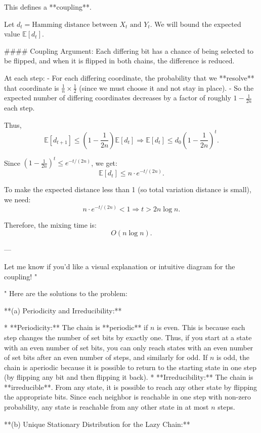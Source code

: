 \begin{enumerate}
\begin{shaded}
This defines a **coupling**.

Let \( d_t = \text{Hamming distance between } X_t \text{ and } Y_t \). We will bound the expected value \( \mathbb{E}[d_t] \).

#### Coupling Argument:
Each differing bit has a chance of being selected to be flipped, and when it is flipped in both chains, the difference is reduced.

At each step:
- For each differing coordinate, the probability that we **resolve** that coordinate is \( \frac{1}{n} \times \frac{1}{2} \) (since we must choose it and not stay in place).
- So the expected number of differing coordinates decreases by a factor of roughly \( 1 - \frac{1}{2n} \) each step.

Thus,
\[
\mathbb{E}[d_{t+1}] \leq \left(1 - \frac{1}{2n}\right) \mathbb{E}[d_t]
\Rightarrow \mathbb{E}[d_t] \leq d_0 \left(1 - \frac{1}{2n}\right)^t.
\]

Since \( \left(1 - \frac{1}{2n}\right)^t \leq e^{-t/(2n)} \), we get:
\[
\mathbb{E}[d_t] \leq n \cdot e^{-t/(2n)}.
\]

To make the expected distance less than 1 (so total variation distance is small), we need:
\[
n \cdot e^{-t/(2n)} < 1 \Rightarrow t > 2n \log n.
\]

Therefore, the mixing time is:
\[
\boxed{O(n \log n)}.
\]

---

Let me know if you'd like a visual explanation or intuitive diagram for the coupling!
"

"
Here are the solutions to the problem:

**(a) Periodicity and Irreducibility:**

* **Periodicity:** The chain is **periodic** if $n$ is even. This is because each step changes the number of set bits by exactly one. Thus, if you start at a state with an even number of set bits, you can only reach states with an even number of set bits after an even number of steps, and similarly for odd. If $n$ is odd, the chain is aperiodic because it is possible to return to the starting state in one step (by flipping any bit and then flipping it back).
* **Irreducibility:** The chain is **irreducible**. From any state, it is possible to reach any other state by flipping the appropriate bits. Since each neighbor is reachable in one step with non-zero probability, any state is reachable from any other state in at most $n$ steps.

**(b) Unique Stationary Distribution for the Lazy Chain:**


\end{shaded}
\end{enumerate}
